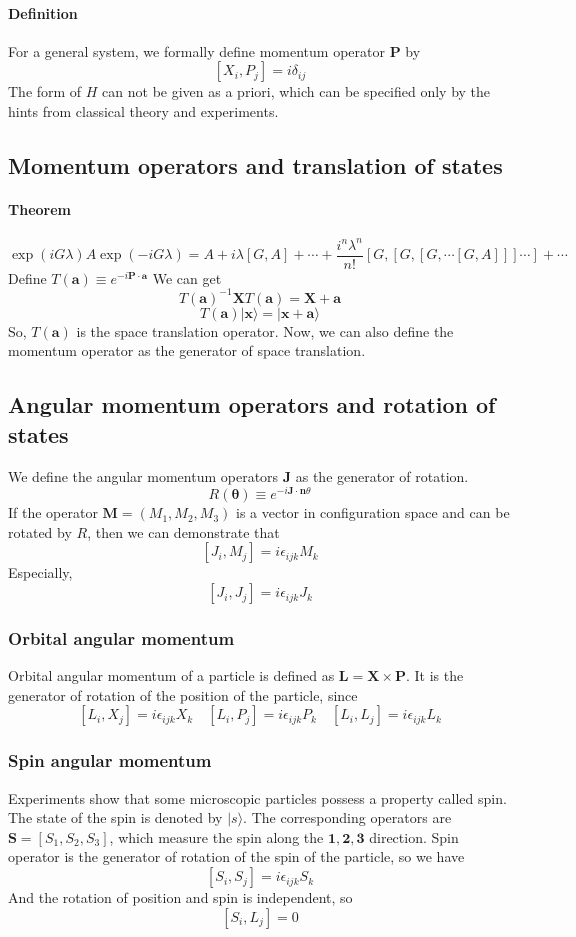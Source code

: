 \documentclass{article}
\begin{document}
\paragraph{Definition} For a general system, we formally define momentum operator $\mathbf{P}$ by 
\[[X_i,P_j] = i \delta_{ij}\]
The form of $H$ can not be given as a priori, which can be specified only by the hints from classical theory and experiments.

\subsection{Momentum operators and translation of states}
\paragraph{Theorem} 
\[\exp(iG\lambda) A \exp(-iG\lambda) = A + i\lambda[G,A] + \cdots + \frac{i^n\lambda^n}{n!}[G,[G,[G,\cdots[G,A]]]\cdots]+\cdots\]
Define $T(\mathbf{a}) \equiv e^{-i\mathbf{P \cdot a}}$
We can get
\[T(\mathbf{a})^{-1} \mathbf{X} T(\mathbf{a}) = \mathbf{X} + \mathbf{a}\]
\[T(\mathbf{a})|\mathbf{x}\rangle = |\mathbf{x}+\mathbf{a}\rangle\]
So, $T(\mathbf{a})$ is the space translation operator. 
Now, we can also define the momentum operator as the generator of space translation.

\subsection{Angular momentum operators and rotation of states}
We define the angular momentum operators $\mathbf{J}$ as the generator of rotation.
\[R(\mathbf{\theta}) \equiv e^{-i\mathbf{J} \cdot \mathbf{n} \theta}\]
If the operator $\mathbf{M} = (M_1,M_2,M_3)$ is a vector in configuration space and can be rotated by $R$, then we can demonstrate that
\[[J_{i},M_{j}] = i \epsilon_{ijk}M_k\]
Especially, 
\[[J_i,J_j] = i\epsilon_{ijk}J_k\]

\subsubsection{Orbital angular momentum}
Orbital angular momentum of a particle is defined as $\mathbf{L} = \mathbf{X} \times \mathbf{P}$. It is the generator of rotation of the position of the particle, since
\[[L_i,X_j] = i\epsilon_{ijk}X_k \quad [L_i,P_j] = i\epsilon_{ijk}P_k \quad [L_i,L_j] = i\epsilon_{ijk}L_k\]

\subsubsection{Spin angular momentum}
Experiments show that some microscopic particles possess a property called spin. The state of the spin is denoted by $|s\rangle$. The corresponding operators are $\mathbf{S} = [S_1,S_2,S_3]$, which measure the spin along the $\mathbf{1},\mathbf{2},\mathbf{3}$ direction. Spin operator is the generator of rotation of the spin of the particle, so we have
\[[S_i,S_j]=i\epsilon_{ijk}S_k\]
And the rotation of position and spin is independent, so
\[[S_i,L_j] = 0\]
\end{document}

